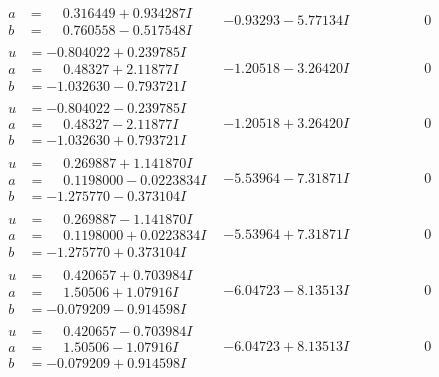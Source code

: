 \documentclass[1p]{elsarticle_modified}
\theoremstyle{definition}
\begin{document}
$$\begin{array}{c|c|c}
\begin{aligned}
a &= \phantom{-}0.316449 + 0.934287 I \\
b &= \phantom{-}0.760558 - 0.517548 I\end{aligned}
 & -0.93293 - 5.77134 I & \phantom{-0.000000 } 0 \\ \hline\begin{aligned}
u &= -0.804022 + 0.239785 I \\
a &= \phantom{-}0.48327 + 2.11877 I \\
b &= -1.032630 - 0.793721 I\end{aligned}
 & -1.20518 - 3.26420 I & \phantom{-0.000000 } 0 \\ \hline\begin{aligned}
u &= -0.804022 - 0.239785 I \\
a &= \phantom{-}0.48327 - 2.11877 I \\
b &= -1.032630 + 0.793721 I\end{aligned}
 & -1.20518 + 3.26420 I & \phantom{-0.000000 } 0 \\ \hline\begin{aligned}
u &= \phantom{-}0.269887 + 1.141870 I \\
a &= \phantom{-}0.1198000 - 0.0223834 I \\
b &= -1.275770 - 0.373104 I\end{aligned}
 & -5.53964 - 7.31871 I & \phantom{-0.000000 } 0 \\ \hline\begin{aligned}
u &= \phantom{-}0.269887 - 1.141870 I \\
a &= \phantom{-}0.1198000 + 0.0223834 I \\
b &= -1.275770 + 0.373104 I\end{aligned}
 & -5.53964 + 7.31871 I & \phantom{-0.000000 } 0 \\ \hline\begin{aligned}
u &= \phantom{-}0.420657 + 0.703984 I \\
a &= \phantom{-}1.50506 + 1.07916 I \\
b &= -0.079209 - 0.914598 I\end{aligned}
 & -6.04723 - 8.13513 I & \phantom{-0.000000 } 0 \\ \hline\begin{aligned}
u &= \phantom{-}0.420657 - 0.703984 I \\
a &= \phantom{-}1.50506 - 1.07916 I \\
b &= -0.079209 + 0.914598 I\end{aligned}
 & -6.04723 + 8.13513 I & \phantom{-0.000000 } 0\\

\end{array}$$
\end{document}
